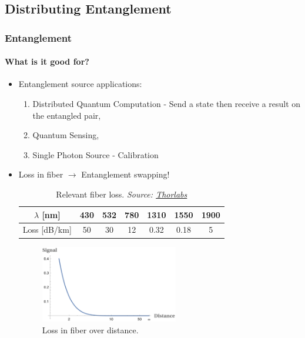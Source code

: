 \documentclass[serif,8pt]{beamer}
\begin{document}
\subsection{Distributing Entanglement}
\begin{frame}[t]
	\frametitle{Entanglement}
	\framesubtitle{What is it good for?}
	\begin{itemize}
		\item Entanglement source applications:
			\begin{enumerate}
				\item Distributed Quantum Computation - Send a state then receive a result on the entangled pair,
				\item Quantum Sensing,
				\item Single Photon Source - Calibration
			\end{enumerate}
		\item Loss in fiber $\rightarrow$ Entanglement swapping!
	\begin{table}
		\caption{Relevant fiber loss. \textit{Source: \href{https://www.thorlabs.com/newgrouppage9.cfm?objectgroup_id=949}{Thorlabs}}}
		\label{tab:fiberloss}
		\begin{tabular}{|c|c|c|c|c|c|c|}
			\hline
			$\lambda$ [nm] & 430 & 532 & 780 & 1310 & 1550 & 1900\\
			\hline
			Loss [dB/km] & 50 & 30 & 12 & 0.32 &  0.18 & 5\\
			\hline
		\end{tabular}
	\end{table}
	\begin{figure}
		\begin{center}
			\includegraphics[width=6cm]{FiberLoss.png}
		\end{center}
		\caption{Loss in fiber over distance.}\label{fig:fiberloss}
	\end{figure}
	\end{itemize}
\end{frame}
\end{document}

